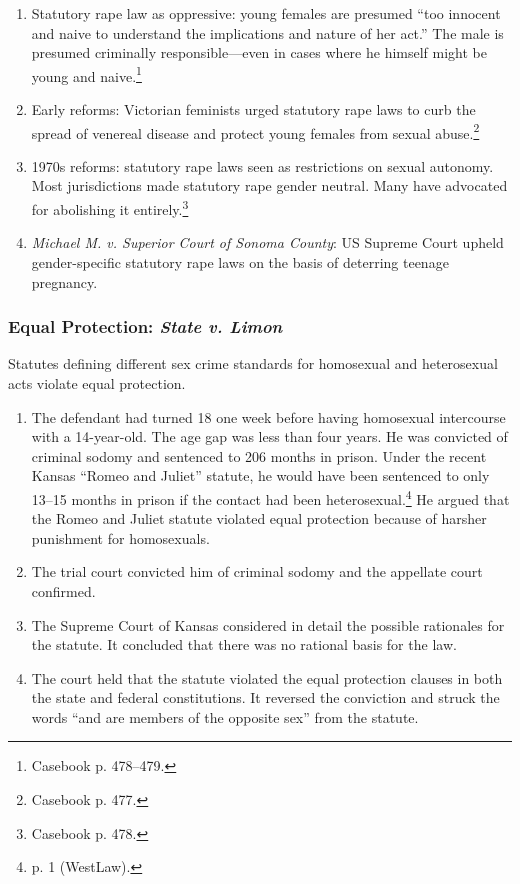 \begin{enumerate}
    \item Statutory rape law as oppressive: young females are presumed ``too 
    innocent and naive to understand the implications and nature of her act.'' 
    The male is presumed criminally responsible---even in cases where he 
    himself might be young and naive.\footnote{Casebook p. 478--479.}
    \item Early reforms: Victorian feminists urged statutory rape laws to curb 
    the spread of venereal disease and protect young females from sexual 
    abuse.\footnote{Casebook p. 477.}
    \item 1970s reforms: statutory rape laws seen as restrictions on sexual 
    autonomy. Most jurisdictions made statutory rape gender neutral. Many have 
    advocated for abolishing it entirely.\footnote{Casebook p. 478.}
    \item \emph{Michael M. v. Superior Court of Sonoma County}: US Supreme 
    Court upheld gender-specific statutory rape laws on the basis of deterring 
    teenage pregnancy.
\end{enumerate}

\subsubsection{Equal Protection: \emph{State v. Limon}}

Statutes defining different sex crime standards for homosexual and 
heterosexual acts violate equal protection.

\begin{enumerate}
    \item The defendant had turned 18 one week before having homosexual 
    intercourse with a 14-year-old. The age gap was less than four years. He 
    was convicted of criminal sodomy and sentenced to 206 months in prison. 
    Under the recent Kansas ``Romeo and Juliet'' statute, he would have been 
    sentenced to only 13--15 months in prison if the contact had been 
    heterosexual.\footnote{p. 1 (WestLaw).} He argued that the Romeo and 
    Juliet statute violated equal protection because of harsher punishment for 
    homosexuals.
    \item The trial court convicted him of criminal sodomy and the appellate 
    court confirmed.
    \item The Supreme Court of Kansas considered in detail the possible 
    rationales for the statute. It concluded that there was no rational basis 
    for the law.
    \item The court held that the statute violated the equal protection 
    clauses in both the state and federal constitutions. It reversed the 
    conviction and struck the words ``and are members of the opposite sex'' 
    from the statute.
\end{enumerate}
